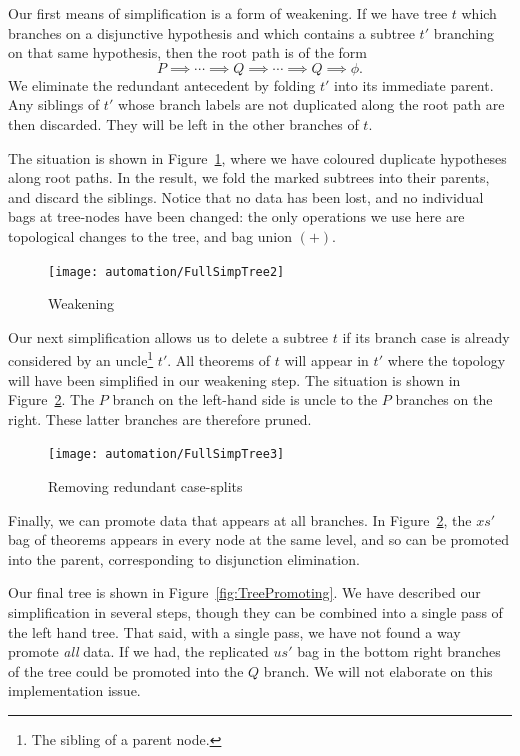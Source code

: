Our first means of simplification is a form of weakening. If we have tree $t$ which branches on a disjunctive hypothesis and which contains a subtree $t'$ branching on that same hypothesis, then the root path is of the form 
\begin{displaymath}
P \implies \cdots \implies Q \implies \cdots \implies Q \implies \phi.
\end{displaymath}
We eliminate the redundant antecedent by folding $t'$ into its immediate parent. Any siblings of $t'$ whose branch labels are not duplicated along the root path are then discarded. They will be left in the other branches of $t$.

The situation is shown in Figure~\ref{fig:TreeWeakening}, where we have coloured duplicate hypotheses along root paths. In the result, we fold the marked subtrees into their parents, and discard the siblings. Notice that no data has been lost, and no individual bags at tree-nodes have been changed: the only operations we use here are topological changes to the tree, and bag union $(+)$.

\begin{figure}
\centering\texttt{[image: automation/FullSimpTree2]}
\caption{Weakening}
\label{fig:TreeWeakening}
\end{figure}

Our next simplification allows us to delete a subtree $t$ if its branch case is already considered by an uncle\footnote{The sibling of a parent node.} $t'$. All theorems of $t$ will appear in $t'$ where the topology will have been simplified in our weakening step. The situation is shown in Figure~\ref{fig:TreeRedundantSplits}. The $P$ branch on the left-hand side is uncle to the $P$ branches on the right. These latter branches are therefore pruned.

\begin{figure}
\centering\texttt{[image: automation/FullSimpTree3]}
\caption{Removing redundant case-splits}
\label{fig:TreeRedundantSplits}
\end{figure}

Finally, we can promote data that appears at all branches. In Figure~\ref{fig:TreeRedundantSplits}, the $xs'$ bag of theorems appears in every node at the same level, and so can be promoted into the parent, corresponding to disjunction elimination. 

Our final tree is shown in Figure~\ref{fig:TreePromoting}. We have described our simplification in several steps, though they can be combined into a single pass of the left hand tree. That said, with a single pass, we have not found a way promote \emph{all} data. If we had, the replicated $us'$ bag in the bottom right branches of the tree could be promoted into the $Q$ branch. We will not elaborate on this implementation issue.

